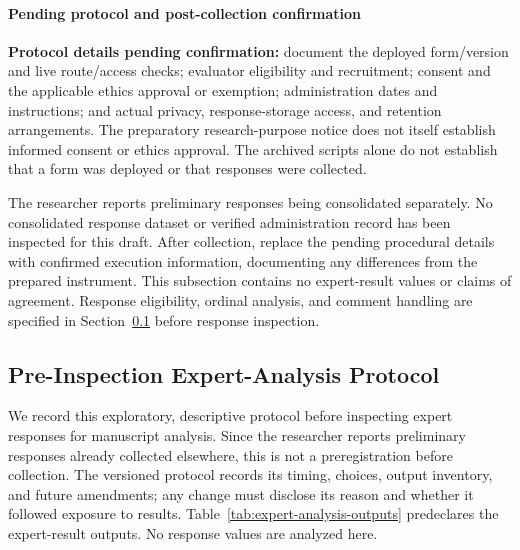 \paragraph{Pending protocol and post-collection confirmation}
\textbf{Protocol details pending confirmation:}
document the deployed form/version and live route/access checks; evaluator
eligibility and recruitment; consent and the applicable ethics approval or
exemption; administration dates and instructions; and actual privacy,
response-storage access, and retention arrangements. The preparatory
research-purpose notice does not itself establish informed consent or ethics
approval. The archived scripts alone do not establish that a form was
deployed or that responses were collected.

The researcher reports preliminary responses being consolidated separately.
No consolidated response dataset or verified administration record has been
inspected for this draft. After collection, replace the pending procedural
details with confirmed execution information, documenting any differences
from the prepared instrument. This subsection contains no expert-result
values or claims of agreement. Response eligibility, ordinal analysis, and
comment handling are specified in Section~\ref{sec:expert-analysis} before
response inspection.


\subsection{Pre-Inspection Expert-Analysis Protocol}
\label{sec:expert-analysis}

We record this exploratory, descriptive protocol before inspecting expert
responses for manuscript analysis. Since the researcher reports preliminary
responses already collected elsewhere, this is not a preregistration before
collection. The versioned protocol records its timing, choices, output
inventory, and future amendments; any change must disclose its reason and
whether it followed exposure to results. Table~\ref{tab:expert-analysis-outputs}
predeclares the expert-result outputs. No response values are analyzed here.


